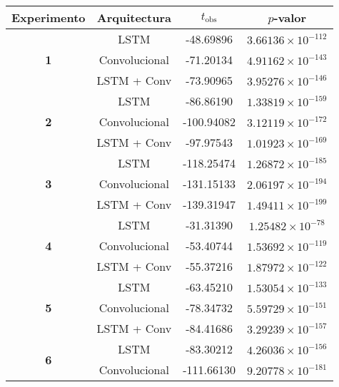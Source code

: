 \documentclass[../main.tex]{subfiles}
\begin{document}
\newpage

\begin{table}[H]
    \centering
    \begin{tabular}{|c|c|c|c|}
    \hline
        \textbf{Experimento} & \textbf{Arquitectura} & \(t_{\text{obs}}\) & \(p\)-valor \\
    \hline\hline
        \multirow{3}{*}{\textbf{1}}
        & LSTM             & -48.69896 & \( 3.66136 \times 10^{-112} \) \\
        & Convolucional    & -71.20134 & \( 4.91162 \times 10^{-143} \) \\
        & LSTM + Conv      & -73.90965 & \( 3.95276 \times 10^{-146} \) \\
        \hline
        \multirow{3}{*}{\textbf{2}}
        & LSTM             & -86.86190  & \( 1.33819 \times 10^{-159} \) \\
        & Convolucional    & -100.94082 & \( 3.12119 \times 10^{-172} \) \\
        & LSTM + Conv      & -97.97543  & \( 1.01923 \times 10^{-169} \) \\
        \hline
        \multirow{3}{*}{\textbf{3}}
        & LSTM             & -118.25474 & \( 1.26872 \times 10^{-185} \) \\
        & Convolucional    & -131.15133 & \( 2.06197 \times 10^{-194} \) \\
        & LSTM + Conv      & -139.31947 & \( 1.49411 \times 10^{-199} \) \\
        \hline
        \multirow{3}{*}{\textbf{4}}
        & LSTM             & -31.31390 & \( 1.25482 \times 10^{-78} \)  \\
        & Convolucional    & -53.40744 & \( 1.53692 \times 10^{-119} \) \\
        & LSTM + Conv      & -55.37216 & \( 1.87972 \times 10^{-122} \) \\
        \hline
        \multirow{3}{*}{\textbf{5}}
        & LSTM             & -63.45210 & \( 1.53054 \times 10^{-133} \) \\
        & Convolucional    & -78.34732 & \( 5.59729 \times 10^{-151} \) \\
        & LSTM + Conv      & -84.41686 & \( 3.29239 \times 10^{-157} \) \\
        \hline
        \multirow{3}{*}{\textbf{6}}
        & LSTM             &  -83.30212 & \( 4.26036 \times 10^{-156} \) \\
        & Convolucional    & -111.66130 & \( 9.20778 \times 10^{-181} \) \\

\end{tabular}
\end{table}
\end{document}
